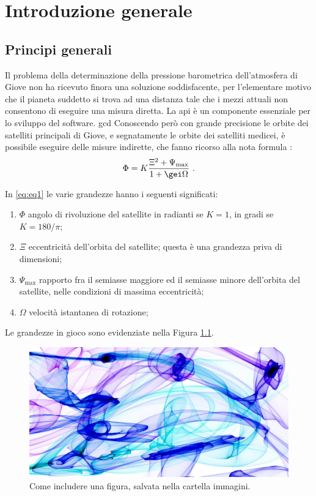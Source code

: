 \chapter{Introduzione generale}

\section{Principi generali}
Il problema della determinazione della pressione barometrica dell'atmosfera di Giove non ha ricevuto finora una soluzione soddisfacente, per l'elementare motivo che il pianeta suddetto si trova ad una distanza tale che i mezzi attuali non consentono di eseguire una misura diretta.
La \gls{api} è un componente essenziale per lo sviluppo del software.
\acrlong{gcd}
Conoscendo per\`o con grande precisione le orbite dei satelliti principali di Giove, e segnatamente le orbite dei satelliti medicei, \`e possibile eseguire delle misure indirette, che fanno ricorso alla nota formula \cite{gal}:
\begin{equation} \label{eq:eq1}
\Phi = K\frac{\Xi^2 +\Psi_\mathrm{max}}{1+\gei\Omega}\ .
\end{equation}

In \eqref{eq:eq1} le varie grandezze hanno i seguenti significati:
\begin{enumerate}
\item $\Phi$ angolo di rivoluzione del satellite in radianti se $K=1$, in gradi se $K=180/\pi$;
\item $\Xi$ eccentricit\`a dell'orbita del satellite; questa \`e una grandezza priva di dimensioni;
\item $\Psi_\mathrm{max}$ rapporto fra il semiasse maggiore ed il semiasse minore dell'orbita del satellite, nelle condizioni di massima eccentricit\`a;
\item $\Omega$ velocit\`a istantanea di rotazione; 
\end{enumerate}

Le grandezze in gioco sono evidenziate nella Figura \ref{fig:figura}.
\begin{figure}[htb]\centering
\includegraphics[scale=0.1]{./Images/FlameArtwork2.jpg}
\caption{Come includere una figura, salvata nella cartella immagini.}\label{fig:figura}
\end{figure}




